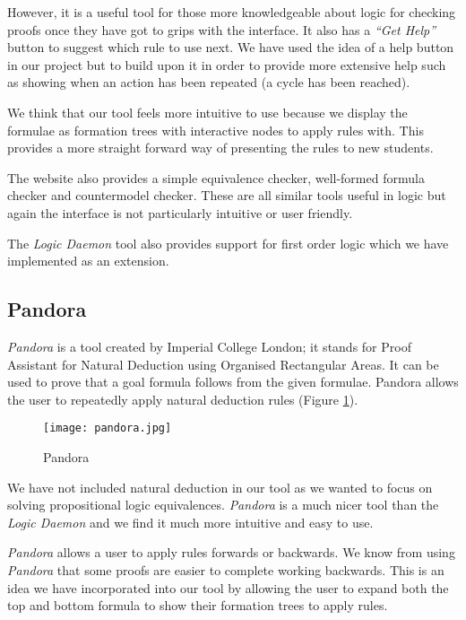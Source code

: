 \documentclass[draft]{report}
\begin{document}
However, it is a useful tool for those more knowledgeable about logic for checking proofs once they have got to grips with the interface. It also has a \textit{``Get Help''} button to suggest which rule to use next. We have used the idea of a help button in our project but to build upon it in order to provide more extensive help such as showing when an action has been repeated (a cycle has been reached).

We think that our tool feels more intuitive to use because we display the formulae as formation trees with interactive nodes to apply rules with. This provides a more straight forward way of presenting the rules to new students.

The website also provides a simple equivalence checker, well-formed formula checker and countermodel checker. These are all similar tools useful in logic but again the interface is not particularly intuitive or user friendly.

The \emph{Logic Daemon} tool also provides support for first order logic which we have implemented as an extension.

\subsection{Pandora}
\label{sub:pandora}

\emph{Pandora}\cite{pandora} is a tool created by Imperial College London; it stands for Proof Assistant for Natural Deduction using Organised Rectangular Areas. It can be used to prove that a goal formula follows from the given formulae. Pandora allows the user to repeatedly apply natural deduction rules (Figure \ref{pandora}).

\begin{figure}[ht!]
    \centering
    \texttt{[image: pandora.jpg]}
    \caption{Pandora}
    \label{pandora}
\end{figure}

We have not included natural deduction in our tool as we wanted to focus on solving propositional logic equivalences. \emph{Pandora} is a much nicer tool than the \emph{Logic Daemon} and we find it much more intuitive and easy to use.

\emph{Pandora} allows a user to apply rules forwards or backwards. We know from using \emph{Pandora} that some proofs are easier to complete working backwards. This is an idea we have incorporated into our tool by allowing the user to expand both the top and bottom formula to show their formation trees to apply rules. 
\end{document}
